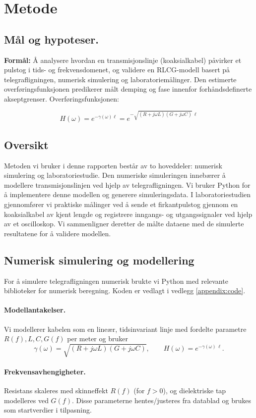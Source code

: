 \section{Metode}

\subsection{Mål og hypoteser.}
\textbf{Formål:} Å analysere hvordan en transmisjonslinje (koaksialkabel) påvirker et pulstog i tids- og frekvensdomenet, og validere en RLCG-modell basert på telegrafligningen, numerisk simulering og laboratoriemålinger. Den estimerte overføringsfunksjonen predikerer målt demping og fase innenfor forhåndsdefinerte akseptgrenser. Overføringsfunksjonen:

\[
H(\omega) = e^{-\gamma(\omega)\ell} = e^{-\sqrt{(R+j\omega L)(G+j\omega C)}\,\ell}
\]

\subsection{Oversikt}
Metoden vi bruker i denne rapporten består av to hoveddeler: numerisk simulering og laboratoriestudie. Den numeriske simuleringen innebærer å modellere transmisjonslinjen ved hjelp av telegrafligningen. Vi bruker Python for å implementere denne modellen og generere simuleringsdata. I laboratoriestudien gjennomfører vi praktiske målinger ved å sende et firkantpulstog gjennom en koaksialkabel av kjent lengde og registrere inngangs- og utgangssignaler ved hjelp av et oscilloskop. Vi sammenligner deretter de målte dataene med de simulerte resultatene for å validere modellen.

\subsection{Numerisk simulering og modellering}
For å simulere telegrafligningen numerisk brukte vi Python med relevante biblioteker for numerisk beregning. Koden er vedlagt i vedlegg \ref{appendix:code}.
\paragraph{Modellantakelser.}
Vi modellerer kabelen som en lineær, tidsinvariant linje med fordelte parametre $R(f),L,C,G(f)$ per meter og bruker
\[
\gamma(\omega)=\sqrt{(R+j\omega L)(G+j\omega C)},\qquad
H(\omega)=e^{-\gamma(\omega)\,\ell}.
\]

\paragraph{Frekvensavhengigheter.}
Resistans skaleres med skinneffekt $R(f)$ (for $f>0$), og dielektriske tap modelleres ved
$G(f)$. Disse parameterne hentes/justeres fra datablad og brukes som startverdier i tilpasning.

